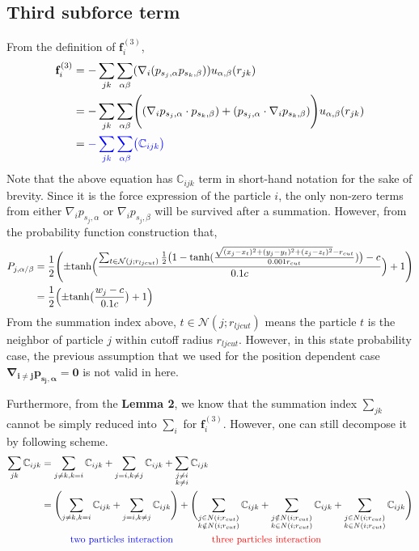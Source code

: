 \documentclass[11pt, oneside]{article}   	%
\begin{document}
\subsection{Third subforce term}
From the definition of $\mathbf{f}_i^{(3)}$, 
\begin{align}
\mathbf{f}^{(3)}_i &= - \sum_{jk} \sum_{\alpha \beta} (\nabla_i (p_{s_j, \alpha} p_{s_k, \beta})) u_{\alpha, \beta} (r_{jk}) \\ \notag
& = - \sum_{jk} \sum_{\alpha \beta} \Biggl( (\nabla_i p_{s_j,\alpha} \cdot p_{s_k,\beta}) + (p_{s_j,\alpha} \cdot \nabla_i p_{s_k,\beta}) \Biggr)  u_{\alpha, \beta} (r_{jk}) \\
&=  \color{blue}- \sum_{jk} \sum_{\alpha \beta} \bigl( \mathbb{C}_{ijk} \bigr)
\end{align}
Note that the above equation has $\mathbb{C}_{ijk}$ term in short-hand notation for the sake of brevity. Since it is the force expression of the particle $i$, the only non-zero terms from either $\nabla_i p_{s_j,\alpha}$ or $\nabla_i p_{s_j,\beta}$ will be survived after a summation. However, from the probability function construction that, 
\begin{align}
P_{j,\alpha/\beta} &= \frac{1}{2} \Biggl( \pm\textrm{tanh} \Bigl( \frac{\sum_{t \in \mathcal{N}(j;r_{lj cut})} \frac{1}{2} \bigl(1-\textrm{tanh}(\frac{\sqrt{(x_j-x_t)^2+(y_j-y_t)^2+(z_j-z_t)^2}-r_{cut}}{0.001r_{cut}})\bigr)-c}{0.1c} \Bigr) + 1 \Biggr) \\ \notag
&=  \frac{1}{2} \Bigl( \pm\textrm{tanh} \bigl( \frac{w_j-c}{0.1c} \bigr) + 1 \Bigr)
\end{align}
From the summation index above, $t \in \mathcal{N}(j;r_{lj cut})$ means the particle $t$ is the neighbor of particle $j$ within cutoff radius $r_{lj cut}$. However, in this state probability case, the previous assumption that we used for the position dependent case $\mathbf{\nabla_{i\neq j}p_{s_j,\alpha} =0}$ is not valid in here. 

Furthermore, from the \textbf{Lemma 2}, we know that the summation index $\sum_{jk}$ cannot be simply reduced into $\sum_i$ for $\textbf{f}_i^{(3)}$. However, one can still decompose it by following scheme.
\begin{align}
\sum_{jk} \mathbb{C}_{ijk} &= \sum_{j \neq k, k = i} \mathbb{C}_{ijk}+\sum_{j=i, k\neq j} \mathbb{C}_{ijk}+  \sum_{\substack{j\neq i \\ k \neq i}}\mathbb{C}_{ijk} \\ \notag
& = \Biggl( \sum_{j \neq k, k = i} \mathbb{C}_{ijk}+\sum_{j=i, k\neq j} \mathbb{C}_{ijk}\Biggr) + \Biggl(\sum_{\substack{j \in N(i;r_{cut}) \\ k \notin N(i;r_{cut})}} \mathbb{C}_{ijk}+ \sum_{\substack{j \notin N(i;r_{cut})\\ k \in N(i;r_{cut})}}\mathbb{C}_{ijk} + \sum_{\substack{j \in N(i;r_{cut}) \\ k \in N(i;r_{cut})}} \mathbb{C}_{ijk}\Biggr) \\ \notag
& \quad \color{blue} \quad \quad \textrm{two particles interaction}  \quad \quad \quad \quad \color{red} \textrm{three particles interaction} 
\end{align}
\end{document}
